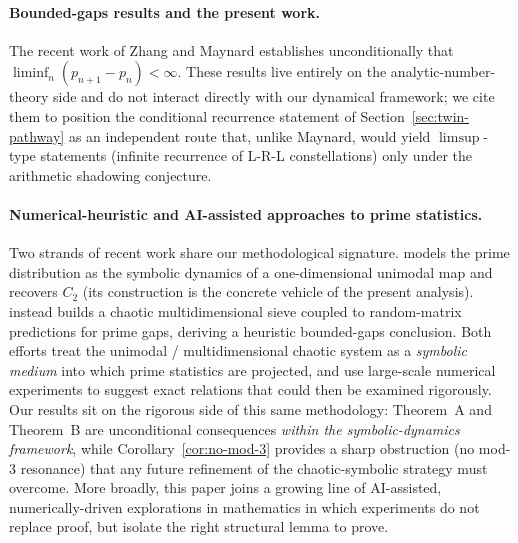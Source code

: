 \paragraph{Bounded-gaps results and the present work.}
The recent work of Zhang \cite{zhang2014bounded} and Maynard
\cite{maynard2015small} establishes unconditionally that
$\liminf_{n} (p_{n+1} - p_n) < \infty$. These results live entirely on
the analytic-number-theory side and do not interact directly with our
dynamical framework; we cite them to position the conditional
recurrence statement of Section~\ref{sec:twin-pathway} as an
independent route that, unlike Maynard, would yield $\limsup$-type
statements (infinite recurrence of L-R-L constellations) only under
the arithmetic shadowing conjecture.

\paragraph{Numerical-heuristic and AI-assisted approaches to prime statistics.}
Two strands of recent work share our methodological signature.
\cite{wang2026emergence} models the prime distribution as the symbolic
dynamics of a one-dimensional unimodal map and recovers $C_2$
(its construction is the concrete vehicle of the present analysis).
\cite{chaoticsieve2025} instead builds a chaotic multidimensional sieve
coupled to random-matrix predictions for prime gaps, deriving a
heuristic bounded-gaps conclusion. Both efforts treat the unimodal /
multidimensional chaotic system as a \emph{symbolic medium} into which
prime statistics are projected, and use large-scale numerical
experiments to suggest exact relations that could then be examined
rigorously. Our results sit on the rigorous side of this same
methodology: Theorem~A and Theorem~B are unconditional consequences
\emph{within the symbolic-dynamics framework}, while
Corollary~\ref{cor:no-mod-3} provides a sharp obstruction (no mod-$3$
resonance) that any future refinement of the chaotic-symbolic strategy
must overcome. More broadly, this paper joins a growing line of
AI-assisted, numerically-driven explorations in mathematics
\cite{davies2021advancing,romera2024funsearch,trinh2024alphageometry,aidriven2024review,mathmachsurvey2024}
in which experiments do not replace proof, but isolate the right
structural lemma to prove.
